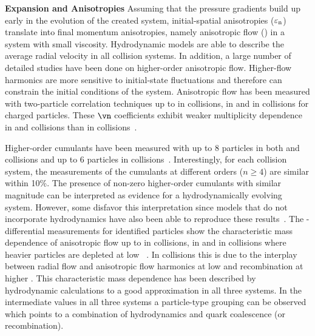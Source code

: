 \documentclass[../report.tex]{subfiles}
\begin{document}
\textbf{Expansion and Anisotropies}
Assuming that the pressure gradients build up early in the evolution of the created system, initial-spatial anisotropies ($\varepsilon_{\rm{n}}$) translate into final momentum anisotropies, namely anisotropic flow (\vn) in a system with small viscosity. Hydrodynamic models are able to describe the average radial velocity in all collision systems. In addition, a large number of detailed studies have been done on higher-order anisotropic flow. Higher-flow harmonics are more sensitive to initial-state fluctuations and therefore can constrain the initial conditions of the system. Anisotropic flow has been measured with two-particle correlation techniques up to \vseven in \PbPb collisions, \vfive in \pPb and \vfour in \pp collisions for charged particles. These $\vn$ coefficients exhibit weaker multiplicity dependence in \pp and \pPb collisions than in \PbPb collisions~\cite{CMS:2012qk,Abelev:2012ola,Aad:2012gla,Aamodt:2011by,Chatrchyan:2011eka,Chatrchyan:2012wg,ATLAS:2012at,Aad:2014lta,Aad:2015gqa,CMS:2015zpa,Khachatryan:2016txc,Acharya:2017ino,Adam:2016ows,Adam:2016nfo,Acharya:2018zuq,Sirunyan:2017uyl,Aaboud:2017acw}.

Higher-order cumulants have been measured with up to 8 particles in both \PbPb and \pPb collisions and up to 6 particles in \pp collisions~\cite{Aad:2013fja,Chatrchyan:2013nka,Khachatryan:2016txc,Aamodt:2010pa,ALICE:2011ab,Chatrchyan:2012ta,Abelev:2014mda,Chatrchyan:2013kba,Aad:2014vba,Khachatryan:2015waa,Adam:2016izf,CMS:2015ica,Sirunyan:2017pan,Sirunyan:2017igb,Aaboud:2017acw,Aaboud:2017blb}. Interestingly, for each collision system, the measurements of the cumulants at different orders ($n \geq 4$) are similar within 10\%. The presence of non-zero higher-order cumulants with similar magnitude can be interpreted as evidence for a hydrodynamically evolving system. However, some disfavor this interpretation since models that do not incorporate hydrodynamics have also been able to reproduce these results~\cite{Jia:2014pza,Gyulassy:2014cfa,McLerran:2014uka}. The \pT-differential \vn measurements for identified particles show the characteristic mass dependence of anisotropic flow up to \vfive in \PbPb collisions, \vthree in \pPb and \vtwo in \pp collisions where heavier particles are depleted at low \pT~\cite{Abelev:2014pua,Abelev:2012di,Adam:2016nfo,Khachatryan:2014jra,ABELEV:2013wsa,CMS:2015kua,Khachatryan:2016txc,Acharya:2018zuq}. In \PbPb collisions this is due to the interplay between radial flow and anisotropic flow harmonics at low \pT and recombination at higher \pT. This characteristic mass dependence has been described by hydrodynamic calculations to a good approximation in all three systems. In the intermediate \pT values in all three systems a particle-type grouping can be observed which points to a combination of hydrodynamics and quark coalescence (or recombination).
\end{document}
